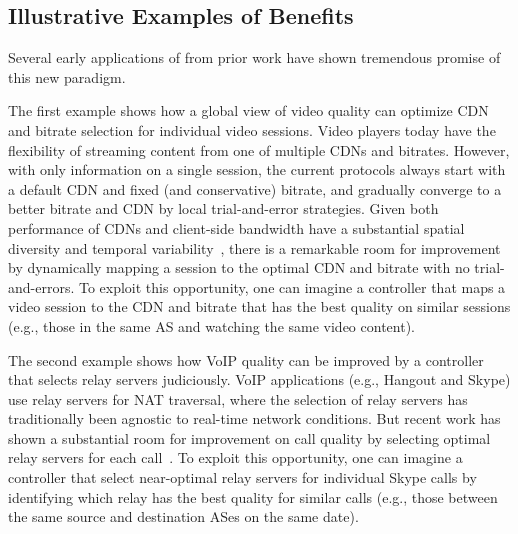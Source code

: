 \subsection{Illustrative Examples of \ddn Benefits}
\label{subsec:overview:examples}

Several early applications of \ddn from prior work have shown 
tremendous promise of this new paradigm.

The first example shows how a global view of video quality 
can optimize CDN and bitrate selection for individual video 
sessions. 
Video players today have the flexibility of streaming content 
from one of multiple CDNs and bitrates. However, with
only information on a single session, the current protocols 
always start with a default CDN and fixed (and conservative) 
bitrate, and gradually converge to a better bitrate and 
CDN by local trial-and-error strategies.
Given both performance of CDNs and client-side bandwidth 
have a substantial spatial diversity
  and temporal variability~\cite{sigcomm12}, there is a
remarkable room for improvement by dynamically mapping a 
session to the optimal CDN and bitrate with no trial-and-errors.
To exploit this opportunity, one can imagine a \ddn controller
that maps a video session  to the CDN and bitrate that has 
the best quality on similar sessions (e.g.,
those in the same AS and watching the same video content).


The second example shows how VoIP quality can be improved by 
a \ddn controller that selects relay servers judiciously.
VoIP applications (e.g., Hangout and Skype) use relay servers 
for NAT traversal, where the selection of relay servers 
has traditionally been agnostic to real-time network conditions. 
But recent work has shown a
substantial room for improvement on call quality by selecting 
optimal relay servers for each
call~\cite{rewan-hotnets2015}. 
To exploit this opportunity, one can imagine a \ddn controller
that select near-optimal relay servers for individual Skype calls 
by identifying which relay has the best quality for similar calls 
(e.g., those between the same source and destination ASes 
on the same date).


